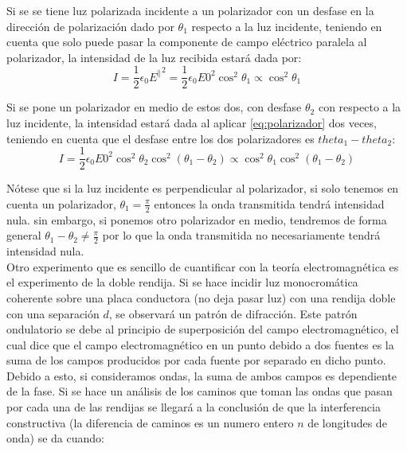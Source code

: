 \documentclass[%
 reprint,
 amsmath,amssymb,
 aps,
]{revtex4-1}
\begin{document}
Si se se tiene luz polarizada incidente a un polarizador con un desfase en la dirección de polarización dado por $\theta_1$ respecto a la luz incidente, teniendo en cuenta que solo puede pasar la componente de campo eléctrico paralela al polarizador, la intensidad de la luz recibida estará dada por:\\

\begin{equation}
I = \frac{1}{2}\epsilon_0{E^{\parallel}}^2 = \frac{1}{2}\epsilon_0{E0}^2{\cos^2{\theta_1}} \propto \cos^2{\theta_1}
\label{polarizador}
\end{equation}

Si se pone un polarizador en medio de estos dos, con desfase $\theta_2$ con respecto a la luz incidente, la intensidad estará dada al aplicar \ref{eq:polarizador} dos veces, teniendo en cuenta que el desfase entre los dos polarizadores es $theta_1-theta_2$:\\

\begin{equation}
I = \frac{1}{2}\epsilon_0{E0}^2{\cos^2{\theta_2}}\cos^2{ \left( \theta_1-\theta_2 \right) } \propto \cos^2{ \theta_1}\cos^2{ \left( \theta_1-\theta_2 \right) }
\label{polarizador2}
\end{equation}

Nótese que si la luz incidente es perpendicular al polarizador, si solo tenemos en cuenta un polarizador, $\theta_1 = \frac{\pi}{2}$ entonces la onda transmitida tendrá intensidad nula. sin embargo, si ponemos otro polarizador en medio, tendremos de forma general $\theta_1 - \theta_2 \neq \frac{\pi}{2}$ por lo que la onda transmitida no necesariamente tendrá intensidad nula.\\

Otro experimento que es sencillo de cuantificar con la teoría electromagnética es el experimento de la doble rendija. Si se hace incidir luz monocromática coherente sobre una placa conductora (no deja pasar luz) con una rendija doble con una separación $d$, se observará un patrón de difracción. Este patrón ondulatorio se debe al principio de superposición del campo electromagnético, el cual dice que el campo electromagnético en un punto debido a dos fuentes es la suma de los campos producidos por cada fuente por separado en dicho punto. Debido a esto, si consideramos ondas, la suma de ambos campos es dependiente de la fase. Si se hace un análisis de los caminos que toman las ondas que pasan por cada una de las rendijas se llegará a la conclusión de que la interferencia constructiva (la diferencia de caminos es un numero entero $n$ de longitudes de onda) se da cuando:\\
\end{document}
